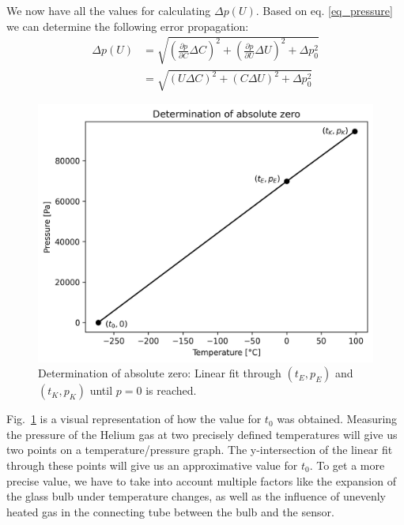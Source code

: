     We now have all the values for calculating $\Delta p(U)$. Based on eq. \ref{eq_pressure} we can determine the following error propagation:
    \begin{align}
        \Delta p(U) &= \sqrt{ \left(\frac{\partial p}{\partial C} \Delta C \right)^2 +
                            \left(\frac{\partial p}{\partial U} \Delta U \right)^2 +
                            \Delta p_0^2}\\
        &= \sqrt{ \left( U \Delta C \right)^2 +
                \left( C \Delta U \right)^2 + 
                \Delta p_0^2} \label{eq_dlta_p}
    \end{align}

    \begin{figure}[H]
        \centering
        \includegraphics[]{src/images/absolute_zero.png}
        \caption{Determination of absolute zero: Linear fit through $(t_E, p_E)$ and $(t_K, p_K)$ until $p = 0$ is reached.}
        \label{fig_abs_zero}
    \end{figure}
    Fig.~\ref{fig_abs_zero} is a visual representation of how the value for $t_0$ was obtained. Measuring the pressure of the Helium gas at two precisely
    defined temperatures will give us two points on a temperature/pressure graph. The y-intersection of the linear fit through these points will give us an approximative value for $t_0$.
    To get a more precise value, we have to take into account multiple factors like the expansion of the glass bulb under temperature changes, 
    as well as the influence of unevenly heated gas in the connecting tube between the bulb and the sensor.

